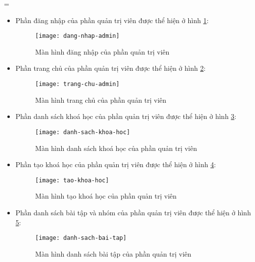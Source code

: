 =\documentclass[../Thesis.tex]{subfiles}
\begin{document}
            \begin{itemize}
                \item Phần đăng nhập của phần quản trị viên được thể hiện ở hình \ref{fig:dang-nhap-admin}:

                \begin{figure}[hbt!]
                    \centering\texttt{[image: dang-nhap-admin]}
                    \caption{Màn hình đăng nhập của phần quản trị viên}
                    \label{fig:dang-nhap-admin}
                \end{figure}
                \FloatBarrier

                \item Phần trang chủ của phần quản trị viên được thể hiện ở hình \ref{fig:trang-chu-admin}:
                \begin{figure}[hbt!]
                    \centering\texttt{[image: trang-chu-admin]}
                    \caption{Màn hình trang chủ của phần quản trị viên}
                    \label{fig:trang-chu-admin}
                \end{figure}
                \FloatBarrier

                \item Phần danh sách khoá học của phần quản trị viên được thể hiện ở hình \ref{fig:danh-sach-khoa-hoc}:
                \begin{figure}[hbt!]
                    \centering\texttt{[image: danh-sach-khoa-hoc]}
                    \caption{Màn hình danh sách khoá học của phần quản trị viên}
                    \label{fig:danh-sach-khoa-hoc}
                \end{figure}
                \FloatBarrier

                \item Phần tạo khoá học của phần quản trị viên được thể hiện ở hình \ref{fig:tao-khoa-hoc}:
                \begin{figure}[hbt!]
                    \centering\texttt{[image: tao-khoa-hoc]}
                    \caption{Màn hình tạo khoá học của phần quản trị viên}
                    \label{fig:tao-khoa-hoc}
                \end{figure}
                \FloatBarrier


                \item Phần danh sách bài tập và nhóm của phần quản trị viên được thể hiện ở hình \ref{fig:danh-sach-bai-tap}:
                \begin{figure}[hbt!]
                    \centering\texttt{[image: danh-sach-bai-tap]}
                    \caption{Màn hình danh sách bài tập của phần quản trị viên}
                    \label{fig:danh-sach-bai-tap}
                \end{figure}
                \FloatBarrier


\end{itemize}
\end{document}
